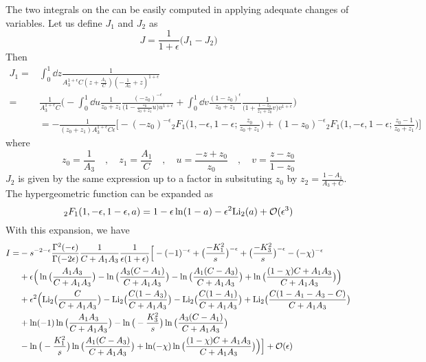 The two integrals on the \rhs can be easily computed in applying adequate changes of variables.
Let us define $J_1$ and $J_2$ as
\begin{equation*}
J = \frac{1}{1+\epsilon}\big(J_1-J_2\big)
\end{equation*}
Then
\begin{equation*}
\begin{split}
J_1 = & \int^1_0 \dd z \frac{1}{A_3^{1+\epsilon}C(z + \frac{A_1}{C})(-\frac{1}{A_3} + z)^{1+\epsilon}} 
\\
= &
\frac{1}{A_3^{1+\epsilon}C}\Big(
-\int^1_0 \dd u \frac{1}{z_0 + z_1}\frac{(-z_0)^{-\epsilon}}{\big(1-\frac{z_0}{z_0 + z_1}u\big) u^{1+\epsilon}} +
\int^1_0\dd v \frac{(1-z_0)^{\epsilon}}{z_0 + z_1}\frac{1}{\big(1+ \frac{1-z_0}{z_1 + z_0}v\big)v^{1+\epsilon}}\Big)
\\
& = 
-\frac{1}{(z_0 + z_1 )A_3^{1+\epsilon}C\epsilon}
\Big[-(-z_0)^{-\epsilon}{}_2F_1\big(1,-\epsilon, 1-\epsilon; \frac{z_0}{z_0 + z_1}\big)
+ (1-z_0)^{-\epsilon}{}_2F_1\big(1, -\epsilon, 1-\epsilon; \frac{z_0 -1}{z_0 + z_1}\big)\Big]
\end{split}
\end{equation*}
where
\begin{equation*}
z_0 = \frac{1}{A_3} \quad, \quad z_1 = \frac{A_1}{C}
\quad,\quad
u=\frac{-z + z_0}{z_0}\quad,\quad
v=\frac{z-z_0}{1-z_0}
\end{equation*}
$J_2$ is given by the same expression up to a factor in subsituting $z_0$ by $z_2 = \frac{1 - A_1}{A_3 + C}$. 
The hypergeometric function can be expanded as
\begin{equation*}
{}_2F_1 (1,-\epsilon, 1-\epsilon, a) = 
1-\epsilon\ln(1-a) - \epsilon^2 \mathrm{Li}_2 (a) + \mathcal{O}(\epsilon^3)
\end{equation*}
With this expansion, we have
\begin{equation*}
\begin{split}
I  = &
-s^{-2-\epsilon}\frac{\Gamma^2(-\epsilon)}{\Gamma(-2\epsilon)}
\frac{1}{C+A_1A_3}\frac{1}{\epsilon(1+\epsilon)}\Big[
-(-1)^{-\epsilon} + \big(\frac{-K_1^2}{s}\big)^{-\epsilon} + \big(\frac{-K_3^2}{s}\big)^{-\epsilon} - (-\chi)^{-\epsilon}
\\
&+
\epsilon\Big(\ln\big(\frac{A_1A_3}{C+A_1A_3}\big) - \ln\big(\frac{A_3(C-A_1 )}{C+A_1A_3}\big) - \ln\big(\frac{A_1(C-A_3)}{C+A_1A_3}\big) +
\ln\big(\frac{(1-\chi)C + A_1A_3}{C+A_1A_3}\big) 
\Big)
\\
& +\epsilon^2\Big(
\mathrm{Li}_2\big(\frac{C}{C+A_1A_3}\big) - \mathrm{Li}_2\big(\frac{C(1-A_3)}{C+A_1A_3}\big) - \mathrm{Li}_2\big(\frac{C(1-A_1)}{C+A_1A_3}\big)+\mathrm{Li}_2\big(\frac{C(1-A_1-A_3-C)}{C+A_1A_3}\big)
\\
& +\ln(-1)\ln\big(\frac{A_1A_3}{C+A_1A_3}\big)
-\ln\big(-\frac{K_3^2}{s}\big)\ln\big(\frac{A_3(C-A_1)}{C+A_1A_3}\big)
\\
&
-\ln\big(-\frac{K_1^2}{s}\big)\ln\big(\frac{A_1(C-A_3)}{C+A_1A_3}\big)
+\ln(-\chi)\ln\big(\frac{(1-\chi)C + A_1A_3}{C+A_1A_3}\big)
\Big)
\Big]
+\mathcal{O}(\epsilon)
\end{split}
\end{equation*}
